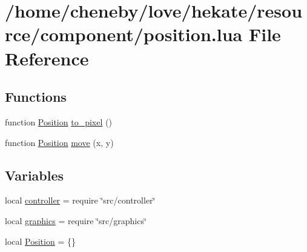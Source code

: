 \hypertarget{position_8lua}{\section{/home/cheneby/love/hekate/resource/component/position.lua File Reference}
\label{position_8lua}
}
\subsection*{Functions}
\begin{DoxyCompactItemize}
\item 
function \hyperlink{position_8lua_a20d457239a648e4496559beb0cf854d2}{Position} \hyperlink{position_8lua_a71bc1b011a2d1afe1ca3fd6a79805489}{to\-\_\-pixel} ()
\item 
function \hyperlink{position_8lua_a20d457239a648e4496559beb0cf854d2}{Position} \hyperlink{position_8lua_a70afb2eb6f78d30fb2626e61285e2139}{move} (x, y)
\end{DoxyCompactItemize}
\subsection*{Variables}
\begin{DoxyCompactItemize}
\item 
local \hyperlink{position_8lua_a42ca47a193e6b84d402c2a9fab0a69f1}{controller} = require \char`\"{}src/controller\char`\"{}
\item 
local \hyperlink{position_8lua_aae06ace8bee01f93d02dfaa4436de916}{graphics} = require \char`\"{}src/graphics\char`\"{}
\item 
local \hyperlink{position_8lua_a20d457239a648e4496559beb0cf854d2}{Position} = \{\}
\end{DoxyCompactItemize}


